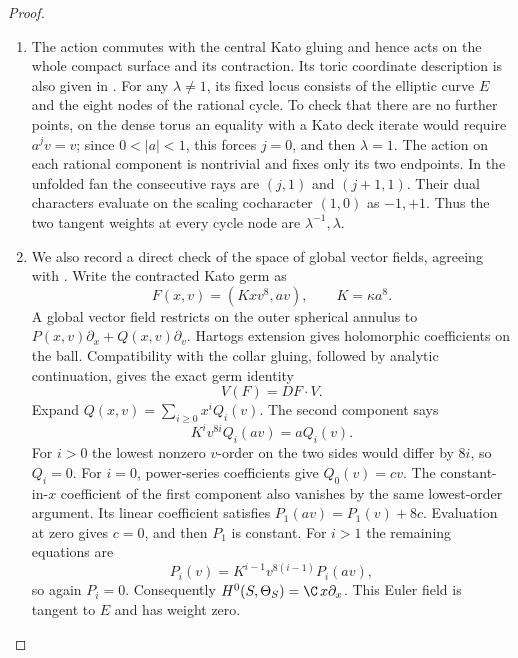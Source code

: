 \begin{proof}
\begin{enumerate}[label=\arabic*.,leftmargin=*]
\item The action commutes with the central Kato gluing and hence
acts on the whole compact surface and its contraction.
Its toric coordinate description is also given in
\citet[Section~2, equations~(1)--(8)]{Fujiki2009D}.
For any $\lambda\ne1$, its fixed locus consists of the elliptic
curve $E$ and the eight nodes of the rational cycle.
To check that there are no further points, on the dense torus
an equality with a Kato deck iterate would require $a^jv=v$;
since $0<|a|<1$, this forces $j=0$, and then $\lambda=1$.
The action on each rational component is nontrivial and fixes
only its two endpoints.  In the unfolded fan the consecutive
rays are $(j,1)$ and $(j+1,1)$.
Their dual characters evaluate on the scaling cocharacter
$(1,0)$ as $-1,+1$.
Thus the two tangent weights at every cycle node are
$\lambda^{-1},\lambda$.

\item We also record a direct check of the space of global vector
fields, agreeing with \citet[Theorem~1.1]{Fujiki2009D}.
Write the contracted Kato germ as
\[
 F(x,v)=(Kxv^8,av),\qquad K=\kappa a^8.
\]
A global vector field restricts on the outer spherical annulus
to $P(x,v)\partial_x+Q(x,v)\partial_v$.
Hartogs extension gives holomorphic coefficients on the ball.
Compatibility with the collar gluing, followed by analytic
continuation, gives the exact germ identity
\[
 V(F)=DF\cdot V.
\]
Expand $Q(x,v)=\sum_{i\ge0}x^iQ_i(v)$.
The second component says
\[
 K^iv^{8i}Q_i(av)=aQ_i(v).
\]
For $i>0$ the lowest nonzero $v$-order on the two sides would
differ by $8i$, so $Q_i=0$.
For $i=0$, power-series coefficients give $Q_0(v)=cv$.
The constant-in-$x$ coefficient of the first component also
vanishes by the same lowest-order argument.
Its linear coefficient satisfies
$P_1(av)=P_1(v)+8c$.
Evaluation at zero gives $c=0$, and then $P_1$ is constant.
For $i>1$ the remaining equations are
\[
 P_i(v)=K^{i-1}v^{8(i-1)}P_i(av),
\]
so again $P_i=0$.
Consequently $H^0(S,\Theta_S)=\C\,x\partial_x$.
This Euler field is tangent to $E$ and has weight zero.


\end{enumerate}
\end{proof}
